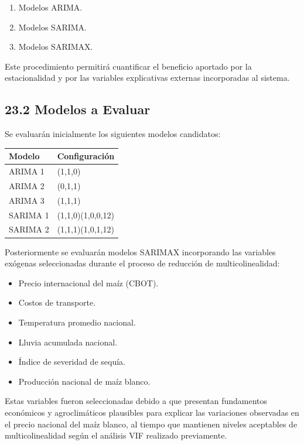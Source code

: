 \documentclass[11pt]{article}
\providecommand{\tightlist}{%
      \setlength{\itemsep}{0pt}\setlength{\parskip}{0pt}}
\begin{document}
\begin{enumerate}
\def\labelenumi{\arabic{enumi}.}
\tightlist
\item
  Modelos ARIMA.
\item
  Modelos SARIMA.
\item
  Modelos SARIMAX.
\end{enumerate}

Este procedimiento permitirá cuantificar el beneficio aportado por la
estacionalidad y por las variables explicativas externas incorporadas al
sistema.

    \hypertarget{modelos-a-evaluar}{%
\subsection{23.2 Modelos a Evaluar}\label{modelos-a-evaluar}}

Se evaluarán inicialmente los siguientes modelos candidatos:

\begin{longtable}[]{@{}ll@{}}
\toprule\noalign{}
Modelo & Configuración \\
\midrule\noalign{}
\endhead
\bottomrule\noalign{}
\endlastfoot
ARIMA 1 & (1,1,0) \\
ARIMA 2 & (0,1,1) \\
ARIMA 3 & (1,1,1) \\
SARIMA 1 & (1,1,0)(1,0,0,12) \\
SARIMA 2 & (1,1,1)(1,0,1,12) \\
\end{longtable}

Posteriormente se evaluarán modelos SARIMAX incorporando las variables
exógenas seleccionadas durante el proceso de reducción de
multicolinealidad:

\begin{itemize}
\tightlist
\item
  Precio internacional del maíz (CBOT).
\item
  Costos de transporte.
\item
  Temperatura promedio nacional.
\item
  Lluvia acumulada nacional.
\item
  Índice de severidad de sequía.
\item
  Producción nacional de maíz blanco.
\end{itemize}

Estas variables fueron seleccionadas debido a que presentan fundamentos
económicos y agroclimáticos plausibles para explicar las variaciones
observadas en el precio nacional del maíz blanco, al tiempo que
mantienen niveles aceptables de multicolinealidad según el análisis VIF
realizado previamente.
\end{document}
